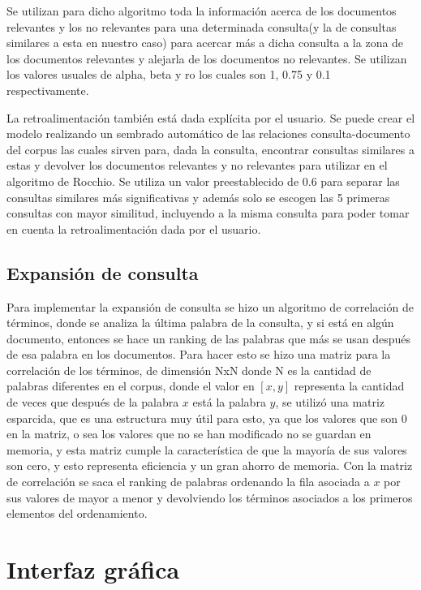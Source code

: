 \documentclass[runningheads]{llncs}
\begin{document}
Se utilizan para dicho algoritmo toda la información acerca de los documentos relevantes y los no 
relevantes para una determinada consulta(y la de consultas similares a esta en nuestro caso) para 
acercar más a dicha consulta a la zona de los documentos relevantes y alejarla de los documentos no 
relevantes. Se utilizan los valores usuales de alpha,
beta y ro los cuales son 1, 0.75 y 0.1 respectivamente. 

La retroalimentación también está dada explícita por el usuario. Se puede crear el modelo realizando 
un sembrado automático de las relaciones consulta-documento del corpus las cuales sirven para, dada la 
consulta, encontrar consultas similares a estas y devolver los documentos relevantes y no relevantes 
para utilizar en el algoritmo de Rocchio. Se utiliza un valor preestablecido de 0.6 para separar las 
consultas similares más significativas y además solo se escogen las 5 primeras consultas con mayor 
similitud, incluyendo a la misma consulta para poder tomar en cuenta la retroalimentación dada por el 
usuario.

\subsection{Expansión de consulta}

Para implementar la expansión de consulta se hizo un algoritmo de correlación de términos, donde se analiza la última palabra de la 
consulta, y si está en algún documento, entonces se hace un ranking de las palabras que más se usan después de esa palabra en los
documentos. Para hacer esto se hizo una matriz para la correlación de los términos, de dimensión NxN donde N es la cantidad de 
palabras diferentes en el corpus, donde el valor en $[x,y]$ representa la cantidad de veces que después de la palabra $x$ está 
la palabra $y$, se utilizó una matriz esparcida, que es una estructura muy útil para esto, ya que los valores que son 0 en la 
matriz, o sea los valores que no se han modificado no se guardan en memoria, y esta matriz cumple la característica de que la 
mayoría de sus valores son cero, y esto representa eficiencia y un gran ahorro de memoria. Con la matriz de correlación se saca 
el ranking de palabras ordenando la fila asociada a $x$ por sus valores de mayor a menor y devolviendo los términos asociados a 
los primeros elementos del ordenamiento.

\section{Interfaz gráfica}
\end{document}

